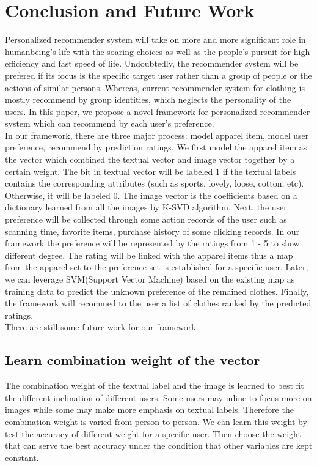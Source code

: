 \section{Conclusion and Future Work}\label{sec:conclusion}

Personalized recommender system will take on more and more significant role in humanbeing's life with the soaring choices as well as the people's pursuit for high efficiency and fast speed of life. Undoubtedly, the recommender system will be prefered if its focus is the specific target user rather than a group of people or the actions of similar persons. Whereas, current recommender system for clothing is mostly recommend by group identities, which neglects the personality of the users. In this paper, we propose a novel framework for personalized recommender system which can recommend by each user's preference.\\

	In our framework, there are three major process: model apparel item, model user preference, recommend by prediction ratings. We first model the apparel item as the vector which combined the textual vector and image vector together by a certain weight. The bit in textual vector will be labeled 1 if the textual labels contains the corresponding attributes (such as sports, lovely, loose, cotton, etc). Otherwise, it will be labeled 0. The image vector is the coefficients based on a dictionary learned from all the images by K-SVD algorithm. Next, the user preference will be collected through some action records of the user such as scanning time, favorite items, purchase history of some clicking records. In our framework the preference will be represented by the ratings from 1 - 5 to show different degree. The rating will be linked with the apparel items thus a map from the apparel set to the preference set is established for a specific user. Later, we can leverage SVM(Support Vector Machine) based on the existing map as training data to predict the unknown preference of the remained clothes. Finally, the framework will recommed to the user a list of clothes ranked by the predicted ratings.\\
	
	There are still some future work for our framework.
\subsection{Learn combination weight of the vector}
The combination weight of the textual label and the image is learned to best fit the different inclination of different users. Some users may inline to focus more on images while some may make more emphasis on textual labels. Therefore the combination weight is varied from person to person. We can learn this weight by test the accuracy of different weight for a specific user. Then choose the weight that can serve the best accuracy under the condition that other variables are kept constant.

